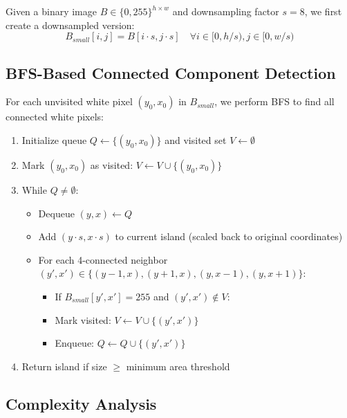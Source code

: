 \documentclass[9pt,a4paper,twocolumn,twoside]{tau-class/tau}
\begin{document}
    Given a binary image $B \in \{0, 255\}^{h \times w}$ and downsampling factor $s=8$, we first create a downsampled version:
    \begin{equation}
        B_{small}[i, j] = B[i \cdot s, j \cdot s] \quad \forall i \in [0, h/s), j \in [0, w/s)
    \end{equation}

    \subsection{BFS-Based Connected Component Detection}

    For each unvisited white pixel $(y_0, x_0)$ in $B_{small}$, we perform BFS to find all connected white pixels:

    \begin{enumerate}
        \item Initialize queue $Q \leftarrow \{(y_0, x_0)\}$ and visited set $V \leftarrow \emptyset$
        \item Mark $(y_0, x_0)$ as visited: $V \leftarrow V \cup \{(y_0, x_0)\}$
        \item While $Q \neq \emptyset$:
        \begin{itemize}
            \item Dequeue $(y, x) \leftarrow Q$
            \item Add $(y \cdot s, x \cdot s)$ to current island (scaled back to original coordinates)
            \item For each 4-connected neighbor $(y', x') \in \{(y-1,x), (y+1,x), (y,x-1), (y,x+1)\}$:
            \begin{itemize}
                \item If $B_{small}[y', x'] = 255$ and $(y', x') \notin V$:
                \item Mark visited: $V \leftarrow V \cup \{(y', x')\}$
                \item Enqueue: $Q \leftarrow Q \cup \{(y', x')\}$
            \end{itemize}
        \end{itemize}
        \item Return island if size $\geq$ minimum area threshold
    \end{enumerate}

    \subsection{Complexity Analysis}
\end{document}
